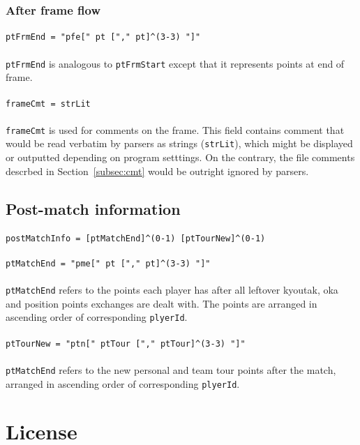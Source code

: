 \documentclass[%
	a4paper%
	,10pt%
	,twoside%
	,notitlepage%
]{article}%
\newcommand*{\ruleSymbol}{\textjapanese{⚠}}%
\newcommand*{\ruleMargin}{\marginpar{\flushright{}\ruleSymbol{}}}%
\newcommand*{\rulePar}{\paragraph*{\ruleMargin{}}}%
\begin{document}
		\subsubsection{After frame flow}\label{subsubsec:postfrmflow}%
			\rulePar{}\lstinline/ptFrmEnd = "pfe[" pt ["," pt]^(3-3) "]"/%
			\paragraph*{}\lstinline/ptFrmEnd/ is analogous to \lstinline/ptFrmStart/ except that it represents points at end of frame. %
			\rulePar{}\lstinline/frameCmt = strLit/%
			\paragraph*{}\lstinline/frameCmt/ is used for comments on the frame. This field contains comment that would be read verbatim by parsers as strings (\lstinline/strLit/), which might be displayed or outputted depending on program setttings. On the contrary, the file comments descrbed in Section~\ref{subsec:cmt} would be outright ignored by parsers. %
	\subsection{Post-match information}%
		\rulePar{}\lstinline/postMatchInfo = [ptMatchEnd]^(0-1) [ptTourNew]^(0-1)/%
		\rulePar{}\lstinline/ptMatchEnd = "pme[" pt ["," pt]^(3-3) "]"/%
		\paragraph*{}\lstinline/ptMatchEnd/ refers to the points each player has after all leftover kyoutak, oka and position points exchanges are dealt with. The points are arranged in ascending order of corresponding \lstinline/plyerId/. %
		\rulePar{}\lstinline/ptTourNew = "ptn[" ptTour ["," ptTour]^(3-3) "]"/%
		\paragraph*{}\lstinline/ptMatchEnd/ refers to the new personal and team tour points after the match, arranged in ascending order of corresponding \lstinline/plyerId/. %
\appendix{}%
\clearpage{}%
\lstset{%
	deleteindex=[1][keywords]%
}%
\section{License}\label{sec:license}%
% 
\end{document}

